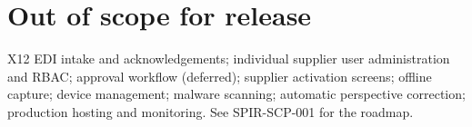 \documentclass[11pt,a4paper]{article}
\begin{document}
\section{Out of scope for release \SPIRRelease}
X12 EDI intake and acknowledgements; individual supplier user administration and RBAC; approval workflow (deferred);
supplier activation screens; offline capture; device management; malware scanning; automatic perspective correction;
production hosting and monitoring. See SPIR-SCP-001 for the roadmap.
\end{document}
